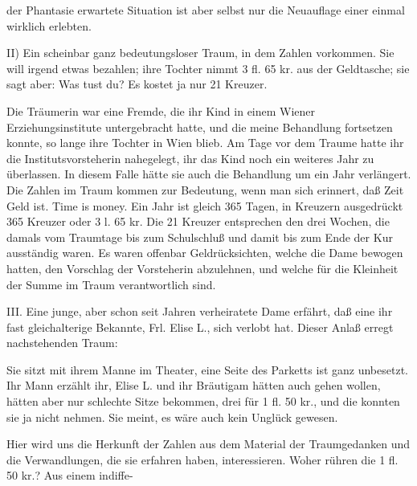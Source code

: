 \documentclass{article}
\begin{document}
         
            
            
            
        \pstart
        der Phantasie erwartete Situation ist aber selbst nur die Neuauflage einer einmal wirklich erlebten.
        \pend
    
            
        \pstart
        II) Ein scheinbar ganz bedeutungsloser Traum, in dem
               Zahlen vorkommen. Sie will irgend etwas bezahlen; ihre
                  Tochter nimmt 3 fl. 65 kr. aus der Geldtasche; sie sagt aber: Was tust du? Es
                  kostet ja nur 21 Kreuzer.
        \pend
    
            
        \pstart
        Die Träumerin war eine Fremde, die ihr Kind in einem Wiener Erziehungsinstitute
               untergebracht hatte, und die meine Behandlung fortsetzen konnte, so lange ihre
               Tochter in Wien blieb. Am Tage vor dem Traume hatte ihr die Institutsvorsteherin nahegelegt, ihr das Kind noch ein weiteres Jahr zu
               überlassen. In diesem Falle hätte sie auch die Behandlung um ein Jahr
               verlängert. Die Zahlen im Traum kommen zur Bedeutung, wenn man sich
               erinnert, daß Zeit Geld ist. Time is money.
               Ein Jahr ist gleich 365 Tagen, in Kreuzern ausgedrückt 365 Kreuzer oder 3 l. 65 kr. Die 21 Kreuzer entsprechen den
               drei Wochen, die damals vom Traumtage bis zum
               Schulschluß und damit bis zum Ende der Kur ausständig waren. Es waren
               offenbar Geldrücksichten, welche die Dame bewogen hatten, den Vorschlag der
               Vorsteherin abzulehnen, und welche für die Kleinheit der Summe im
               Traum verantwortlich sind.
        \pend
    
            
        \pstart
        III. Eine junge, aber schon seit Jahren verheiratete Dame erfährt, daß eine ihr
               fast gleichalterige Bekannte, Frl. Elise L., sich verlobt hat. Dieser Anlaß
               erregt nachstehenden Traum:
        \pend
    
            
        \pstart
        Sie sitzt mit ihrem Manne im Theater, eine Seite des Parketts ist
                  ganz unbesetzt. Ihr Mann erzählt ihr, Elise L. und ihr Bräutigam hätten auch gehen
                  wollen, hätten aber nur schlechte Sitze bekommen, drei für 1 ﬂ. 50 kr., und die
                  konnten sie ja nicht nehmen. Sie meint, es wäre auch kein Unglück
               gewesen.
        \pend
    
            
        \pstart
        Hier wird uns die Herkunft der Zahlen aus dem Material der Traumgedanken und die
               Verwandlungen, die sie erfahren haben, interessieren. Woher rühren die 1 fl. 50 kr.? Aus einem indiffe-
        \pend
    
\end{document}
